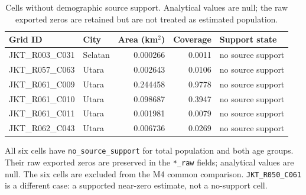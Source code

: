 \begin{table}[H]
\centering
\footnotesize
\caption{Cells without demographic source support. Analytical values are null; the raw exported zeros are retained but are not treated as estimated population.}\label{tab:s8}
\begin{threeparttable}
\begin{tabular}{@{}l l r r l@{}}
\toprule
Grid ID & City & Area (km$^2$) & Coverage & Support state \\
\midrule
JKT\_R003\_C031 & Selatan & 0.000266 & 0.0011 & no source support \\
JKT\_R057\_C063 & Utara & 0.002643 & 0.0106 & no source support \\
JKT\_R061\_C009 & Utara & 0.244458 & 0.9778 & no source support \\
JKT\_R061\_C010 & Utara & 0.098687 & 0.3947 & no source support \\
JKT\_R061\_C011 & Utara & 0.001981 & 0.0079 & no source support \\
JKT\_R062\_C043 & Utara & 0.006736 & 0.0269 & no source support \\
\bottomrule
\end{tabular}
\begin{tablenotes}[flushleft]\footnotesize
\item All six cells have \texttt{no\_source\_support} for total population and both age groups. Their raw exported zeros are preserved in the \texttt{*\_raw} fields; analytical values are null. The six cells are excluded from the M4 common comparison. \texttt{JKT\_R050\_C061} is a different case: a supported near-zero estimate, not a no-support cell.
\end{tablenotes}
\end{threeparttable}
\end{table}